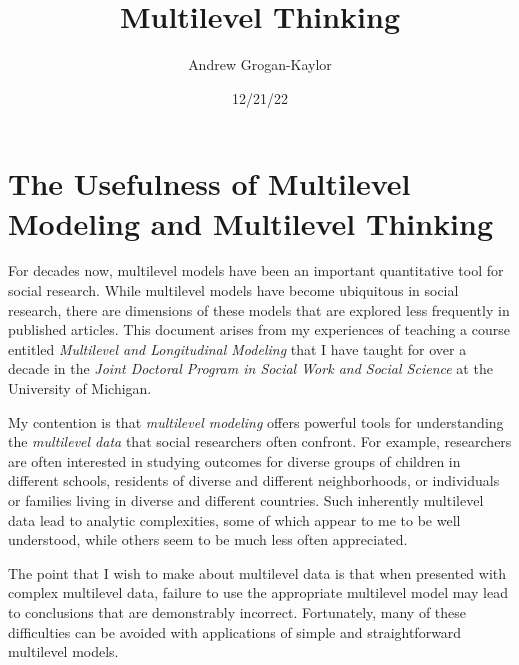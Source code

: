 \documentclass[
  letterpaper,
  DIV=11,
  numbers=noendperiod]{scrreprt}
\title{Multilevel Thinking}
\author{Andrew Grogan-Kaylor}
\date{12/21/22}
\renewcommand*\contentsname{Table of contents}
\newcommand\contentsname{Table of contents}
\begin{document}
\maketitle
\ifdefined\Shaded\renewenvironment{Shaded}{\begin{tcolorbox}[interior hidden, borderline west={3pt}{0pt}{shadecolor}, frame hidden, enhanced, sharp corners, breakable, boxrule=0pt]}{\end{tcolorbox}}\fi

\renewcommand*\contentsname{Table of contents}
{
\hypersetup{linkcolor=}
\setcounter{tocdepth}{2}
\tableofcontents
}

\hypertarget{the-usefulness-of-multilevel-modeling-and-multilevel-thinking}{%
\chapter{The Usefulness of Multilevel Modeling and Multilevel
Thinking}\label{the-usefulness-of-multilevel-modeling-and-multilevel-thinking}}

For decades now, multilevel models have been an important quantitative
tool for social research. While multilevel models have become ubiquitous
in social research, there are dimensions of these models that are
explored less frequently in published articles. This document arises
from my experiences of teaching a course entitled \emph{Multilevel and
Longitudinal Modeling} that I have taught for over a decade in the
\emph{Joint Doctoral Program in Social Work and Social Science} at the
University of Michigan.

My contention is that \emph{multilevel modeling} offers powerful tools
for understanding the \emph{multilevel data} that social researchers
often confront. For example, researchers are often interested in
studying outcomes for diverse groups of children in different schools,
residents of diverse and different neighborhoods, or individuals or
families living in diverse and different countries. Such inherently
multilevel data lead to analytic complexities, some of which appear to
me to be well understood, while others seem to be much less often
appreciated.

The point that I wish to make about multilevel data is that when
presented with complex multilevel data, failure to use the appropriate
multilevel model may lead to conclusions that are demonstrably
incorrect. Fortunately, many of these difficulties can be avoided with
applications of simple and straightforward multilevel models.
\end{document}
